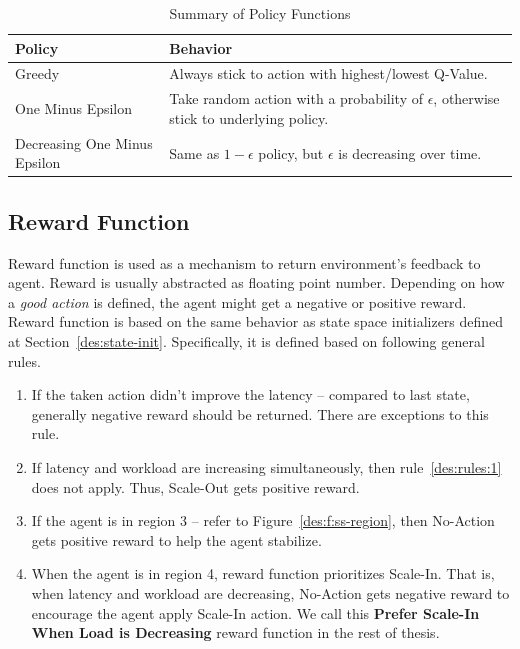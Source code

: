 \begin{table}[h]
    \begin{tabular}{ll}
        \toprule
        \textbf{Policy} & \textbf{Behavior}\\
        \midrule
        Greedy & Always stick to action with highest/lowest Q-Value.\\
        One Minus Epsilon & Take random action with a probability of $\epsilon$, otherwise stick to underlying policy. \\
        Decreasing One Minus Epsilon & Same as $1-\epsilon$ policy, but $\epsilon$ is decreasing over time.\\
        \bottomrule
    \end{tabular}
    \centering
    \caption{Summary of Policy Functions}
    \label{des:tab:policy}
\end{table}

\subsection{Reward Function}

Reward function is used as a mechanism to return environment's feedback to agent. Reward is usually abstracted as floating point number. Depending on how a \emph{good action} is defined, the agent might get a negative or positive reward. Reward function is based on the same behavior as state space initializers defined at Section~\ref{des:state-init}. Specifically, it is defined based on following general rules.
\begin{enumerate}
    \item \label{des:rules:1} If the taken action didn't improve the latency -- compared to last state, generally negative reward should be returned. There are exceptions to this rule.
    \item If latency and workload are increasing simultaneously, then rule~\ref{des:rules:1} does not apply. Thus, Scale-Out gets positive reward.
    \item If the agent is in region 3 -- refer to Figure~\ref{des:f:ss-region}, then No-Action gets positive reward to help the agent stabilize.
    \item When the agent is in region 4, reward function prioritizes Scale-In. That is, when latency and workload are decreasing, No-Action gets negative reward to encourage the agent apply Scale-In action. We call this \textbf{Prefer Scale-In When Load is Decreasing} reward function in the rest of thesis.
\end{enumerate}
